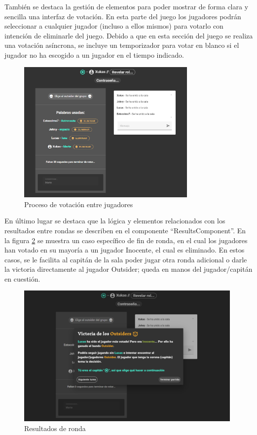 También se destaca la gestión de elementos para poder mostrar de forma clara y sencilla una interfaz de votación. En esta parte
del juego los jugadores podrán seleccionar a cualquier jugador (incluso a ellos mismos) para votarlo con intención de eliminarle
del juego. Debido a que en esta sección del juego se realiza una votación asíncrona, se incluye un temporizador para votar 
en blanco si el jugador no ha escogido a un jugador en el tiempo indicado.

\begin{figure}[h]
	\centering
	\includegraphics[height=7cm,clip=true]{res_votacion.png}
	\caption{Proceso de votación entre jugadores}
	\label{fig:res_votacion}
\end{figure}

En último lugar se destaca que la lógica y elementos relacionados con los resultados entre rondas se describen en el 
componente ``ResultsComponent''. En la figura \ref{fig:res_resultados} se muestra un caso específico de fin de ronda, en el cual los jugadores 
han votado en su mayoría a un jugador Inocente, el cual es eliminado. En estos casos, se le facilita al capitán de 
la sala poder jugar otra ronda adicional o darle la victoria directamente al jugador Outsider; queda en manos del 
jugador/capitán en cuestión.

\begin{figure}[h]
	\centering
	\includegraphics[height=7cm,clip=true]{res_resultados.png}
	\caption{Resultados de ronda}
	\label{fig:res_resultados}
\end{figure}

